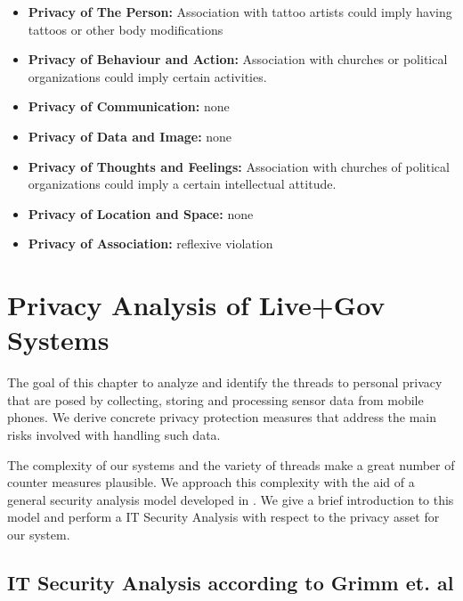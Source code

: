\begin{itemize}

\item
  \textbf{Privacy of The Person:} Association with tattoo artists could
  imply having tattoos or other body modifications
\item
  \textbf{Privacy of Behaviour and Action:} Association with churches or
  political organizations could imply certain activities.
\item
  \textbf{Privacy of Communication:} none
\item
  \textbf{Privacy of Data and Image:} none
\item
  \textbf{Privacy of Thoughts and Feelings:} Association with churches of
  political organizations could imply a certain intellectual attitude.
\item
  \textbf{Privacy of Location and Space:} none
\item
  \textbf{Privacy of Association:} reflexive violation
\end{itemize}




\pagebreak

\chapter{Privacy Analysis of Live+Gov Systems}

The goal of this chapter to analyze and identify the threads to personal privacy that are posed by collecting, storing and processing sensor data from mobile phones.
We derive concrete privacy protection measures that address the main risks involved with handling such data.

The complexity of our systems and the variety of threads make a great number of counter measures plausible.
We approach this complexity with the aid of a general security analysis model developed in \cite{Grimm}.
We give a brief introduction to this model and perform a IT Security Analysis with respect to the privacy asset for our system.

\section{IT Security Analysis according to Grimm et. al}

